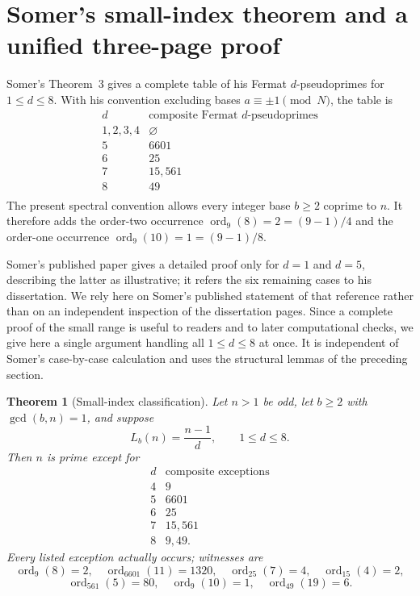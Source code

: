 \documentclass[11pt]{article}
\newtheorem{theorem}{Theorem}[section]
\newcommand{\ord}{\operatorname{ord}}
\begin{document}
\section{Somer's small-index theorem and a unified three-page proof}
\label{sec:small-index}

Somer's Theorem~3 \cite{Somer1989} gives a complete table of his Fermat
$d$-pseudoprimes for $1\le d\le8$.  With his convention excluding bases
$a\equiv\pm1\pmod N$, the table is
\[
\begin{array}{c|c}
 d&\text{composite Fermat $d$-pseudoprimes}\\ \hline
1,2,3,4&\varnothing\\
5&6601\\
6&25\\
7&15,561\\
8&49\\
\end{array}
\]
The present spectral convention allows every integer base $b\ge2$ coprime
to $n$.  It therefore adds the order-two occurrence
$\ord_9(8)=2=(9-1)/4$ and the order-one occurrence
$\ord_9(10)=1=(9-1)/8$.

Somer's published paper gives a detailed proof only for $d=1$ and $d=5$,
describing the latter as illustrative; it refers the six remaining cases to
his dissertation.  We rely here on Somer's published statement of that
reference rather than on an independent inspection of the dissertation pages.  Since a complete proof of the small
range is useful to readers and to later computational checks, we give here
a single argument handling all $1\le d\le8$ at once.  It is independent of
Somer's case-by-case calculation and uses the structural lemmas of the
preceding section.

\begin{theorem}[Small-index classification]
\label{thm:small-index}
Let $n>1$ be odd, let $b\ge2$ with $\gcd(b,n)=1$, and suppose
\[
L_b(n)=\frac{n-1}{d},
\qquad 1\le d\le8.
\]
Then $n$ is prime except for
\[
\begin{array}{c|c}
 d&\text{composite exceptions}\\ \hline
4&9\\
5&6601\\
6&25\\
7&15,561\\
8&9,49.
\end{array}
\]
Every listed exception actually occurs; witnesses are
\[
\ord_9(8)=2,\quad
\ord_{6601}(11)=1320,\quad
\ord_{25}(7)=4,\quad
\ord_{15}(4)=2,
\]
\[
\ord_{561}(5)=80,\quad
\ord_9(10)=1,\quad
\ord_{49}(19)=6.
\]
\end{theorem}
\end{document}
